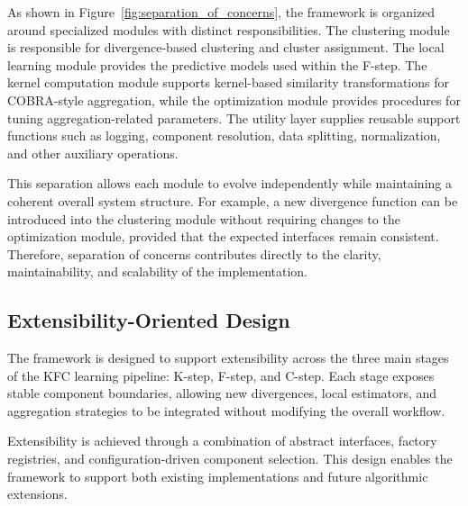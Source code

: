 As shown in Figure~\ref{fig:separation_of_concerns}, the framework is organized around specialized modules with distinct responsibilities. The clustering module is responsible for divergence-based clustering and cluster assignment. The local learning module provides the predictive models used within the F-step. The kernel computation module supports kernel-based similarity transformations for COBRA-style aggregation, while the optimization module provides procedures for tuning aggregation-related parameters. The utility layer supplies reusable support functions such as logging, component resolution, data splitting, normalization, and other auxiliary operations.

This separation allows each module to evolve independently while maintaining a coherent overall system structure. For example, a new divergence function can be introduced into the clustering module without requiring changes to the optimization module, provided that the expected interfaces remain consistent. Therefore, separation of concerns contributes directly to the clarity, maintainability, and scalability of the implementation.


\subsection{Extensibility-Oriented Design}

\hs The framework is designed to support extensibility across the three main stages of the KFC learning pipeline: K-step, F-step, and C-step. Each stage exposes stable component boundaries, allowing new divergences, local estimators, and aggregation strategies to be integrated without modifying the overall workflow.

Extensibility is achieved through a combination of abstract interfaces, factory registries, and configuration-driven component selection. This design enables the framework to support both existing implementations and future algorithmic extensions.


